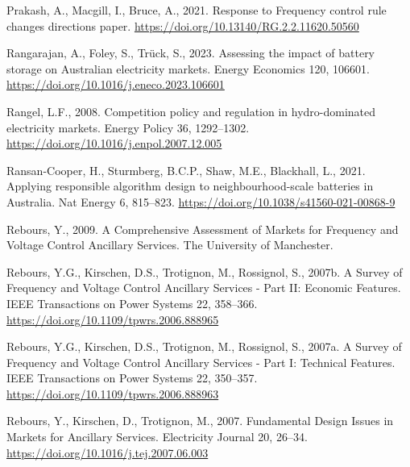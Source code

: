 \documentclass[12pt,a4paper,]{report}
\newlength{\cslhangindent}
\newenvironment{CSLReferences}[2] %
 {%
  \setlength{\parindent}{0pt}
  \ifodd #1 \everypar{\setlength{\hangindent}{\cslhangindent}}\ignorespaces\fi
  \ifnum #2 > 0
  \setlength{\parskip}{#2\baselineskip}
  \fi
 }%
 {}
\begin{document}
\begin{CSLReferences}{1}{0}
\leavevmode{}%
Prakash, A., Macgill, I., Bruce, A., 2021. Response to {Frequency}
control rule changes directions paper.
\url{https://doi.org/10.13140/RG.2.2.11620.50560}

\leavevmode{}%
Rangarajan, A., Foley, S., Trück, S., 2023. Assessing the impact of
battery storage on {Australian} electricity markets. Energy Economics
120, 106601. \url{https://doi.org/10.1016/j.eneco.2023.106601}

\leavevmode{}%
Rangel, L.F., 2008. Competition policy and regulation in hydro-dominated
electricity markets. Energy Policy 36, 1292--1302.
\url{https://doi.org/10.1016/j.enpol.2007.12.005}

\leavevmode{}%
Ransan-Cooper, H., Sturmberg, B.C.P., Shaw, M.E., Blackhall, L., 2021.
Applying responsible algorithm design to neighbourhood-scale batteries
in {Australia}. Nat Energy 6, 815--823.
\url{https://doi.org/10.1038/s41560-021-00868-9}

\leavevmode{}%
Rebours, Y., 2009. A {Comprehensive Assessment} of {Markets} for
{Frequency} and {Voltage Control Ancillary Services}. {The University of
Manchester}.

\leavevmode{}%
Rebours, Y.G., Kirschen, D.S., Trotignon, M., Rossignol, S., 2007b. A
{Survey} of {Frequency} and {Voltage Control Ancillary Services} - {Part
II}: {Economic Features}. IEEE Transactions on Power Systems 22,
358--366. \url{https://doi.org/10.1109/tpwrs.2006.888965}

\leavevmode{}%
Rebours, Y.G., Kirschen, D.S., Trotignon, M., Rossignol, S., 2007a. A
{Survey} of {Frequency} and {Voltage Control Ancillary Services} - {Part
I}: {Technical Features}. IEEE Transactions on Power Systems 22,
350--357. \url{https://doi.org/10.1109/tpwrs.2006.888963}

\leavevmode{}%
Rebours, Y., Kirschen, D., Trotignon, M., 2007. Fundamental {Design
Issues} in {Markets} for {Ancillary Services}. Electricity Journal 20,
26--34. \url{https://doi.org/10.1016/j.tej.2007.06.003}


\end{CSLReferences}
\end{document}

